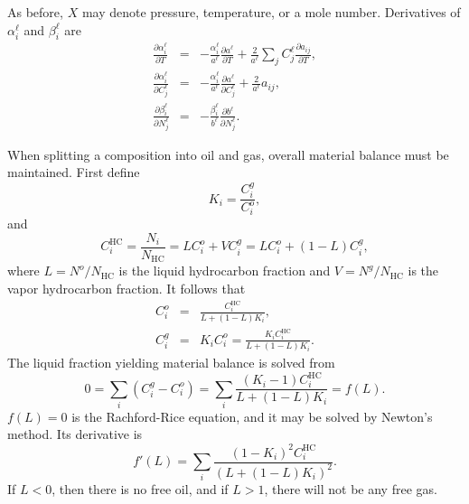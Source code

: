 As before, $X$ may denote pressure, temperature, or a mole number.
Derivatives of $\alpha_i^\ell$ and $\beta_i^\ell$ are
\begin{eqnarray}
  \frac{\partial\alpha_i^\ell}{\partial T} & = &
  -\frac{\alpha_i^\ell}{a^\ell}\frac{\partial a^\ell}{\partial T} +
  \frac{2}{a^\ell} \sum_j C_j^\ell \frac{\partial a_{ij}}{\partial T}, \\
  \frac{\partial\alpha_i^\ell}{\partial C_j^\ell} & = &
  -\frac{\alpha_i^\ell}{a^\ell}\frac{\partial a^\ell}{\partial C_j^\ell} +
  \frac{2}{a^\ell} a_{ij}, \\
  \frac{\partial\beta_i^\ell}{\partial N_j^\ell} & = &
  -\frac{\beta_i^\ell}{b^\ell}\frac{\partial b^\ell}{\partial N_j^\ell}.
\end{eqnarray}



When splitting a composition into oil and gas, overall material
balance must be maintained. First define
\begin{equation}
  K_i = \frac{C_i^g}{C_i^o},
\end{equation}
and
\begin{equation}
  C_i^\text{HC} = \frac{N_i}{N_\text{HC}} = L C_i^o + V C_i^g =
  L C_i^o + (1-L) C_i^g,
\end{equation}
where $L=N^o/N_\text{HC}$ is the liquid hydrocarbon fraction and
$V=N^g/N_\text{HC}$ is the vapor hydrocarbon fraction. It follows
that
\begin{eqnarray}
  C_i^o & = & \frac{C_i^\text{HC}}{L+(1-L) K_i}, \label{eqn:cio} \\
  C_i^g & = & K_i C_i^o = \frac{K_i C_i^\text{HC}}{L+(1-L) K_i}. \label{eqn:cig}
\end{eqnarray}
The liquid fraction yielding material balance is solved from
\begin{equation}
  0 = \sum_i \left( C_i^g - C_i^o \right) =
  \sum_i \frac{(K_i-1) C_i^\text{HC}}{L+(1-L) K_i}
  = f(L).
\end{equation}
$f(L)=0$ is the Rachford-Rice equation, and it may be solved by
Newton's method. Its derivative is
\begin{equation}
  f'(L) = \sum_i\frac{(1-K_i)^2 C_i^\text{HC}}
  {\left(L+(1-L) K_i\right)^2}.
\end{equation}
If $L<0$, then there is no free oil, and if $L>1$, there will not be
any free gas.



